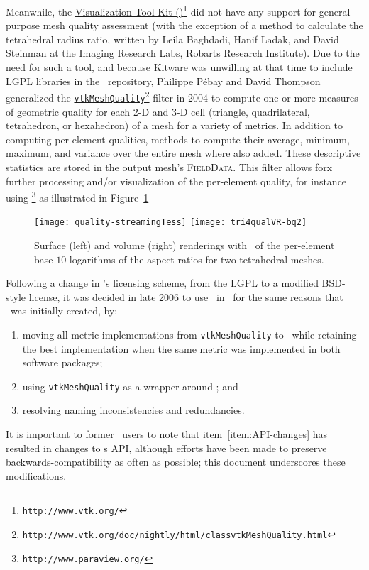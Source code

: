 Meanwhile, the \href{http://www.vtk.org/}{Visualization Tool Kit
(\vtk)\footnote{\href{http://www.vtk.org/}{\texttt{http://www.vtk.org/}}}} did not 
have any support for general purpose mesh quality assessment (with the
exception of a method to calculate the tetrahedral radius ratio,
written by Leila Baghdadi, Hanif Ladak, and David Steinman at the
Imaging Research Labs, Robarts Research Institute). Due to the need for
such a tool, and because Kitware was unwilling at that time to
include LGPL libraries in the \vtk\ repository, Philippe
P\'ebay and David Thompson generalized the \href{http://www.vtk.org/doc/nightly/html/classvtkMeshQuality.html}{\texttt{vtkMeshQuality}}\footnote{\href{http://www.vtk.org/doc/nightly/html/classvtkMeshQuality.html}%
                 {\texttt{http://www.vtk.org/doc/nightly/html/classvtkMeshQuality.html}}}
filter in 2004 to compute one or more measures of geometric quality for each 2-D
and 3-D cell (triangle, quadrilateral, tetrahedron, or hexahedron) of
a mesh for a variety of metrics.
In addition to computing per-element qualities, methods to compute their average, minimum, maximum,
and variance over the entire mesh where also added.
These descriptive statistics are stored in the output mesh's \textsc{FieldData}. This filter allows forx
further processing and/or visualization of the per-element quality,
for instance using
\href{http://www.paraview.org/}{\PV\footnote{\href{http://www.vtk.org/}{\texttt{http://www.paraview.org/}}}}
as illustrated in Figure~\ref{f:viz-qual}
\begin{figure}[ht]
\begin{center}
\hfil
\texttt{[image: quality-streamingTess]}
\hfil
\texttt{[image: tri4qualVR-bq2]}
\hfil
\caption{\label{f:viz-qual} Surface (left) and volume (right)
renderings with \PV\ of the per-element base-$10$ logarithms of the
aspect ratios for two tetrahedral meshes.} 
\end{center}
\end{figure}

Following a change in \verd's licensing scheme, from the LGPL to a modified BSD-style license,
it was decided in late 2006 to use \verd\ in \vtk\ for the same reasons that \verd\ was initially
created, by:
\begin{enumerate}
\item 
moving all metric implementations from \texttt{vtkMeshQuality} to
\verd\, while retaining the best implementation when the same metric
was implemented in both software packages;
\item
using \texttt{vtkMeshQuality} as a wrapper around \verd{}; and
\item
\label{item:API-changes}
resolving naming inconsistencies and redundancies.
\end{enumerate}
It is important to former \verd\ users to note that
item~\ref{item:API-changes} has resulted in changes to \verd{}s API,
although efforts have been made to preserve backwards-compatibility
as often as possible; this document underscores these modifications.

